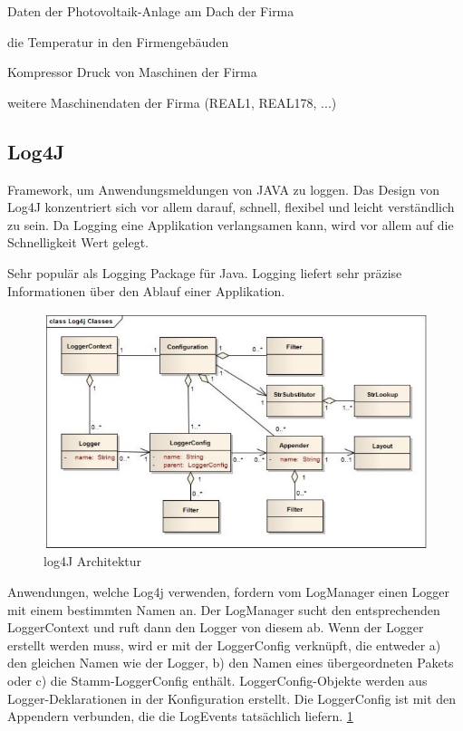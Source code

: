 \begin{compactitem}
    \item Daten der Photovoltaik-Anlage am Dach der Firma
    \item die Temperatur in den Firmengebäuden
    \item Kompressor Druck von Maschinen der Firma
    \item weitere Maschinendaten der Firma (REAL1, REAL178, ...)
\end{compactitem}

\subsection{Log4J}
Framework, um Anwendungsmeldungen von JAVA zu loggen.
Das Design von Log4J konzentriert sich vor allem darauf, schnell, flexibel und leicht verständlich zu sein. Da Logging eine Applikation verlangsamen kann, wird vor allem auf die Schnelligkeit Wert gelegt.  \cite{log4JBuch} 

Sehr populär als Logging Package für Java. Logging liefert sehr präzise Informationen über den Ablauf einer Applikation. \cite{log4J}

\begin{figure}
    \centering
    \includegraphics[scale=0.7]{pics/log4jArchitektur.jpg}
    \caption{log4J Architektur \cite{log4J}}
    \label{fig:impl:log4jArchitektur}
\end{figure}

Anwendungen, welche Log4j verwenden, fordern vom LogManager einen Logger mit einem bestimmten Namen an. Der LogManager sucht den entsprechenden LoggerContext und ruft dann den Logger von diesem ab. 
Wenn der Logger erstellt werden muss, wird er mit der LoggerConfig verknüpft, die entweder a) den gleichen Namen wie der Logger, b) den Namen eines übergeordneten Pakets oder c) die Stamm-LoggerConfig enthält. LoggerConfig-Objekte werden aus Logger-Deklarationen in der Konfiguration erstellt. Die LoggerConfig ist mit den Appendern verbunden, die die LogEvents tatsächlich liefern. \ref{fig:impl:log4jArchitektur} \cite{log4J}
